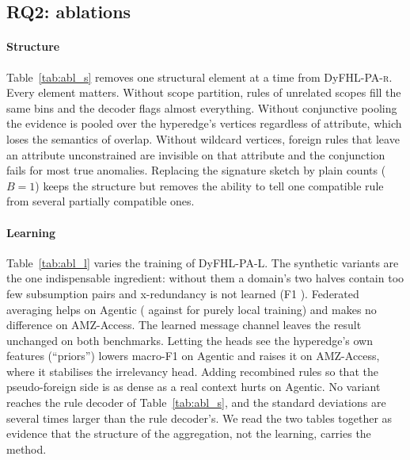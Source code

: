 \documentclass[preprint,12pt]{elsarticle}
\theoremstyle{definition}
\newcommand{\name}{DyFHL-PA\xspace}
\newcommand{\R}{\textsc{r}}
\begin{document}
\subsection{RQ2: ablations}
\label{sec:ablation}
\paragraph{Structure} Table~\ref{tab:abl_s} removes one structural element at a time from \name-\R. Every element matters. Without scope partition, rules of unrelated scopes fill the same bins and the decoder flags almost everything. Without conjunctive pooling the evidence is pooled over the hyperedge's vertices regardless of attribute, which loses the semantics of overlap. Without wildcard vertices, foreign rules that leave an attribute unconstrained are invisible on that attribute and the conjunction fails for most true anomalies. Replacing the signature sketch by plain counts ($B=1$) keeps the structure but removes the ability to tell one compatible rule from several partially compatible ones.

\begin{table}[t]
\caption{Structural ablation of \name-\R{} ($B=512$): macro-F1 per benchmark (mean $\pm$ std, three seeds) and F1 per task averaged over benchmarks.}
\label{tab:abl_s}
\centering\scriptsize
\setlength{\tabcolsep}{3pt}
\end{table}

\paragraph{Learning} Table~\ref{tab:abl_l} varies the training of \name-L. The synthetic variants are the one indispensable ingredient: without them a domain's two halves contain too few subsumption pairs and x-redundancy is not learned (F1 \ablleapseudoanomalyared). Federated averaging helps on Agentic (\ablleafulllearneddecagentic{} against \ablleaFedAvglocaltraagentic{} for purely local training) and makes no difference on AMZ-Access. The learned message channel leaves the result unchanged on both benchmarks. Letting the heads see the hyperedge's own features (``priors'') lowers macro-F1 on Agentic and raises it on AMZ-Access, where it stabilises the irrelevancy head. Adding recombined rules so that the pseudo-foreign side is as dense as a real context hurts on Agentic. No variant reaches the rule decoder of Table~\ref{tab:abl_s}, and the standard deviations are several times larger than the rule decoder's. We read the two tables together as evidence that the structure of the aggregation, not the learning, carries the method.
\end{document}
